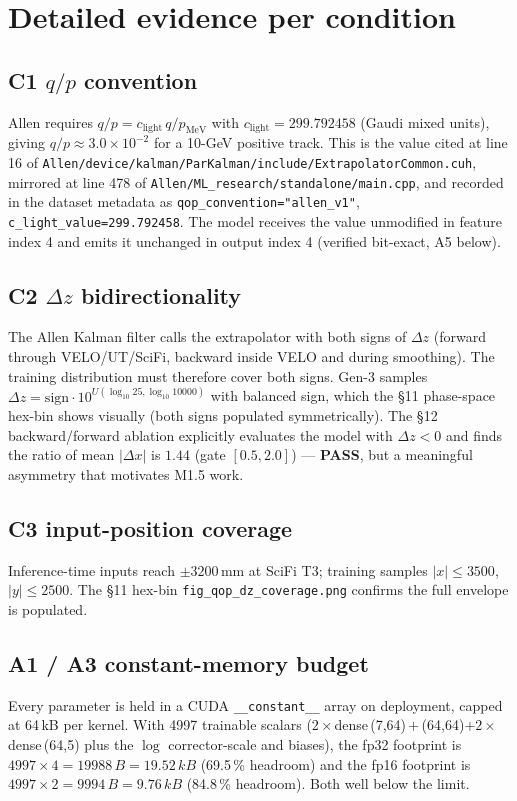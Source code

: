 \documentclass[11pt,a4paper]{article}
\newcommand{\dz}{\ensuremath{\Delta z}}
\newcommand{\qop}{\ensuremath{q/p}}
\newcommand{\PASS}{\textcolor{green!55!black}{\textbf{PASS}}}
\begin{document}
\section{Detailed evidence per condition}

\subsection*{C1 \texorpdfstring{$\qop$}{qop} convention}
Allen requires \(\qop = c_\text{light}\,q/p_\text{MeV}\) with
\(c_\text{light} = 299.792458\) (Gaudi mixed units), giving
\(\qop\approx 3.0{\times}10^{-2}\) for a 10-GeV positive track. This is
the value cited at line 16 of
\texttt{Allen/device/kalman/ParKalman/include/ExtrapolatorCommon.cuh},
mirrored at line 478 of \texttt{Allen/ML\_research/standalone/main.cpp},
and recorded in the dataset metadata as
\texttt{qop\_convention="allen\_v1"}, \texttt{c\_light\_value=299.792458}.
The model receives the value unmodified in feature index 4 and emits it
unchanged in output index 4 (verified bit-exact, A5 below).

\subsection*{C2 \texorpdfstring{$\dz$}{dz} bidirectionality}
The Allen Kalman filter calls the extrapolator with both signs of
\(\dz\) (forward through VELO/UT/SciFi, backward inside VELO and
during smoothing). The training distribution must therefore cover
both signs. Gen-3 samples
\(\dz = \mathrm{sign}\cdot 10^{U(\log_{10}25,\log_{10}10000)}\)
with balanced sign, which the §11 phase-space hex-bin shows visually
(both signs populated symmetrically). The §12 backward/forward
ablation explicitly evaluates the model with \(\dz<0\) and finds the
ratio of mean \(|\Delta x|\) is \(1.44\) (gate \([0.5,2.0]\)) ---
\PASS, but a meaningful asymmetry that motivates M1.5 work.

\subsection*{C3 input-position coverage}
Inference-time inputs reach \(\pm3200\)\,mm at SciFi T3; training
samples \(|x|\le3500\), \(|y|\le2500\). The §11 hex-bin
\texttt{fig\_qop\_dz\_coverage.png} confirms the full envelope is
populated.

\subsection*{A1 / A3 constant-memory budget}
Every parameter is held in a CUDA \texttt{\_\_constant\_\_} array on
deployment, capped at 64\,kB per kernel. With
4997 trainable scalars
(\(2{\times}\)dense\,(7,64)\,+\,(64,64)+\(2{\times}\)dense\,(64,5) plus
the \(\log\) corrector-scale and biases),
the fp32 footprint is
\(4997{\times}4 = 19988\,B = 19.52\,kB\) (69.5\,\%
headroom) and the fp16 footprint is
\(4997{\times}2 = 9994\,B = 9.76\,kB\) (84.8\,\%
headroom). Both well below the limit.
\end{document}
